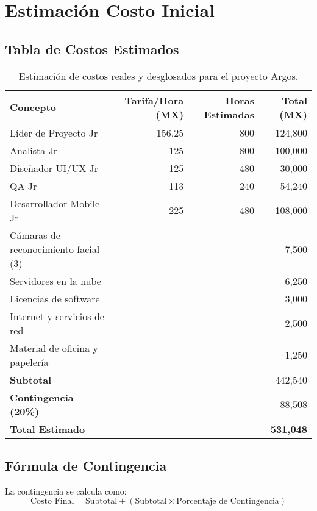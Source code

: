 \section{Estimación Costo Inicial}
\subsection{Tabla de Costos Estimados}
\begin{table}[h!]
    \centering
    \begin{tabular}{lrrr}
        \toprule
        \textbf{Concepto} & \textbf{Tarifa/Hora (MX)} & \textbf{Horas Estimadas} & \textbf{Total (MX)} \\
        \midrule
        Líder de Proyecto Jr & 156.25 & 800 & 124,800 \\
        Analista Jr & 125 & 800 & 100,000 \\
        Diseñador UI/UX Jr & 125 & 480 & 30,000 \\
        QA Jr & 113 & 240 & 54,240 \\
        Desarrollador Mobile Jr & 225 & 480 & 108,000 \\
        Cámaras de reconocimiento facial (3) &  &  & 7,500 \\
        Servidores en la nube &  &  & 6,250 \\
        Licencias de software &  &  & 3,000 \\
        Internet y servicios de red &  &  & 2,500 \\
        Material de oficina y papelería &  &  & 1,250 \\
        \midrule
    	\textbf{Subtotal}      &     &     & 442,540 \\
    	\textbf{Contingencia (20\%)} & &  & 88,508 \\
    \midrule
    	\textbf{Total Estimado} &     &     & \textbf{531,048} \\
        \bottomrule
    \end{tabular}
    \caption{Estimación de costos reales y desglosados para el proyecto Argos.}
\end{table}
\subsection{Fórmula de Contingencia}
La contingencia se calcula como:
\[
\text{Costo Final} = \text{Subtotal} + (\text{Subtotal} \times \text{Porcentaje de Contingencia})
\]